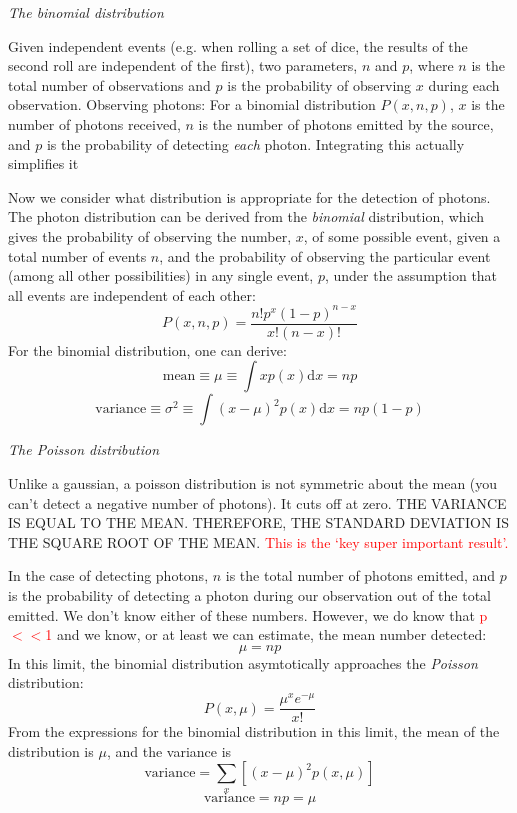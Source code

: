 \documentclass[12pt]{article}
\begin{document}
\emph{The binomial distribution}

\textcolor{myBlue}{Given independent events (e.g. when rolling a set
of dice, the results of the second roll are independent of the first),
two parameters, $n$ and $p$, where $n$
is the total number of observations and $p$ is the probability of
observing $x$ during each observation.
Observing photons:
For a binomial distribution $P(x,n,p)$, $x$ is the number of photons
received, $n$ is the number of
photons emitted by the source, and $p$ is the probability of detecting
\emph{each} photon. Integrating this actually simplifies it}

Now we consider what distribution is appropriate for the
detection of photons. The photon distribution can be derived from the
\emph{binomial} distribution, which gives the probability of observing the
number, $x$, of some possible event, given a total number of events $n$,
and the probability of observing the particular event (among all other
possibilities) in any single event, $p$, under the assumption that all
events are independent of each other:
   $$ P(x,n,p) = \frac{n!p^x(1-p)^{n-x}}{x!(n-x)!}  $$
For the binomial distribution, one can derive:
   $$ \textrm{mean} \equiv \mu \equiv \int xp(x)\textrm{d}x = np $$
   $$ \textrm{variance} \equiv \sigma^2 \equiv
      \int (x-\mu)^2p(x)\textrm{d}x = np(1-p) $$

\emph{The Poisson distribution}

\textcolor{myBlue}{Unlike a gaussian, a poisson distribution is not
symmetric about the mean (you can't detect a negative number of
photons). It cuts off at zero. THE VARIANCE IS EQUAL TO THE MEAN.
THEREFORE, THE STANDARD DEVIATION IS THE SQUARE ROOT OF THE MEAN.}
\textcolor{red}{This is the `key super important result'.}

In the case of detecting photons, $n$ is the total number of
photons emitted, and $p$ is the probability of detecting a photon during
our observation out of the total emitted. We don't know either of
these numbers. However, we do know that
\textcolor{red}{p$<<$1} and we know, or at
least we can estimate, the mean number detected:
  $$  \mu = np $$
In this limit, the binomial distribution asymtotically approaches the
\emph{Poisson} distribution:
   $$  P(x,\mu) = \frac{\mu^x e^{-\mu}}{x!} $$
From the expressions for the binomial distribution in this limit, the
mean of the distribution is $\mu$, and the variance is
  $$  \textrm{variance} = \sum_x [(x-\mu)^2p(x,\mu)] $$
  $$  \textrm{variance} = np = \mu  $$
\end{document}
